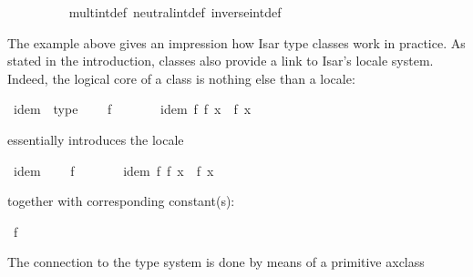 \begin{isabellebody}
\ \ \ \ \ \ \ \ \isamarkupfalse%
\ mult{\isacharunderscore}int{\isacharunderscore}def\ neutral{\isacharunderscore}int{\isacharunderscore}def\ inverse{\isacharunderscore}int{\isacharunderscore}def\ \isacommand{{\isachardot}}\isamarkupfalse%
\isanewline
\ \ \ \ \isamarkupfalse%
%
\endisatagproof
{\isafoldproof}%
%
\isadelimproof
%
\endisadelimproof
\isanewline
\isanewline
\ \ \ \ \isamarkupfalse%
%
\isamarkuptrue%
%
\isamarkuptrue%
%
\begin{isamarkuptext}%
The example above gives an impression how Isar type classes work
  in practice.  As stated in the introduction, classes also provide
  a link to Isar's locale system.  Indeed, the logical core of a class
  is nothing else than a locale:%
\end{isamarkuptext}%
\isamarkuptrue%
\isamarkupfalse%
\ idem\ {\isacharequal}\ type\ {\isacharplus}\isanewline
\ \ \ f\ {\isacharcolon}{\isacharcolon}\ {\isachardoublequoteopen}{\isasymalpha}\ {\isasymRightarrow}\ {\isasymalpha}{\isachardoublequoteclose}\isanewline
\ \ \ idem{\isacharcolon}\ {\isachardoublequoteopen}f\ {\isacharparenleft}f\ x{\isacharparenright}\ {\isacharequal}\ f\ x{\isachardoublequoteclose}%
\begin{isamarkuptext}%
\noindent essentially introduces the locale%
\end{isamarkuptext}%
\isamarkuptrue%
%
\isadelimML
%
\endisadelimML
%
\isatagML
%
\endisatagML
{\isafoldML}%
%
\isadelimML
%
\endisadelimML
{}\isamarkupfalse%
\ idem\ {\isacharequal}\isanewline
\ \ \ f\ {\isacharcolon}{\isacharcolon}\ {\isachardoublequoteopen}{\isasymalpha}\ {\isasymRightarrow}\ {\isasymalpha}{\isachardoublequoteclose}\isanewline
\ \ \ idem{\isacharcolon}\ {\isachardoublequoteopen}f\ {\isacharparenleft}f\ x{\isacharparenright}\ {\isacharequal}\ f\ x{\isachardoublequoteclose}%
\begin{isamarkuptext}%
\noindent together with corresponding constant(s):%
\end{isamarkuptext}%
\isamarkuptrue%
\isamarkupfalse%
\ f\ {\isacharcolon}{\isacharcolon}\ {\isachardoublequoteopen}{\isasymalpha}\ {\isasymRightarrow}\ {\isasymalpha}{\isachardoublequoteclose}%
\begin{isamarkuptext}%
\noindent The connection to the type system is done by means
  of a primitive axclass%

\end{isamarkuptext}
\end{isabellebody}

